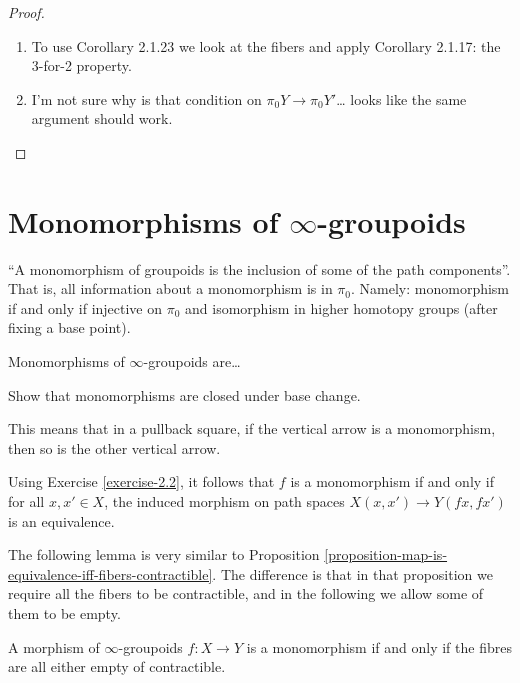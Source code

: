 \begin{proof}
\begin{enumerate}
\item To use Corollary 2.1.23 we look at the fibers and apply
 Corollary 2.1.17: the 3-for-2 property.
\item I'm not sure why is that condition on
$\pi_0Y \to \pi_0Y'$… looks like the same argument should work.
\end{enumerate}
\end{proof}

\section{Monomorphisms of $\infty$-groupoids}
\label{section-monomorphisms}

\noindent
``A monomorphism of groupoids is the inclusion of
some of the path components''. That is, all information
about a monomorphism is in $\pi_0$. Namely:
monomorphism if and only if injective on  $\pi_0$ 
and isomorphism in higher homotopy groups
(after fixing a base point).

Monomorphisms of $\infty$-groupoids are…

\begin{exercise}[2.6]
\label{exercise-2.6}
Show that monomorphisms are closed
under base change.
\end{exercise}

This means that in a pullback square,
if the vertical arrow
is a monomorphism, then so is the
other vertical arrow.

\begin{remark}
\label{remark-monomorphism-equivalence}
Using Exercise \ref{exercise-2.2}, it follows that $f$ is a monomorphism
if and only if for all $x,x' \in X$, the induced
morphism on path spaces $X(x,x') \to Y(fx,fx')$ is
an equivalence.
\end{remark}


\noindent
The following lemma is very similar to
Proposition \ref{proposition-map-is-equivalence-iff-fibers-contractible}.
The difference is that in that proposition we
require all the fibers to be contractible,
and in the following we allow some of them to be empty.

\begin{lemma}
\label{lemma-monomorphism-iff-fibres-are-empty-or-contractible}
A morphism of $\infty$-groupoids $f:X \to Y$ is
a monomorphism if and only if the fibres are all
either empty of contractible.
\end{lemma}

